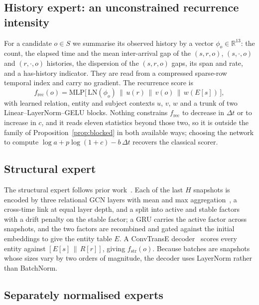 \documentclass[conference]{IEEEtran}
\begin{document}
\subsection{History expert: an unconstrained recurrence intensity}
\label{sec:rec}

For a candidate $o \in S$ we summarise its observed history by a vector
$\phi_o \in \mathbb{R}^{13}$: the count, the elapsed time and the mean
inter-arrival gap of the $(s,r,o)$, $(s,\cdot,o)$ and $(r,\cdot,o)$ histories,
the dispersion of the $(s,r,o)$ gaps, its span and rate, and a has-history
indicator. They are read from a compressed sparse-row temporal index and carry
no gradient. The recurrence score is
\begin{equation}
f_{\mathrm{rec}}(o) = \mathrm{MLP}\bigl[\,\mathrm{LN}(\phi_o)\,\|\,u(r)\,\|\,
v(o)\,\|\,w(E[s])\,\bigr],
\end{equation}
with learned relation, entity and subject contexts $u$, $v$, $w$ and a trunk of
two Linear--LayerNorm--GELU blocks. Nothing constrains $f_{\mathrm{rec}}$ to
decrease in $\Delta t$ or to increase in $c$, and it reads eleven statistics
beyond those two, so it is outside the family of
Proposition~\ref{prop:blocked} in both available ways; choosing the network to
compute $\log a + p\log(1+c) - b\,\Delta t$ recovers the classical scorer.

\subsection{Structural expert}

The structural expert follows prior work~\cite{dimnet,regcn}. Each of the last
$H$ snapshots is encoded by three relational GCN layers with mean and max
aggregation~\cite{pna}, a cross-time link at equal layer depth, and a split
into active and stable factors with a drift penalty on the stable factor; a
GRU carries the active factor across snapshots, and the two factors are
recombined and gated against the initial embeddings to give the entity table
$E$. A
ConvTransE decoder~\cite{convtranse} scores every entity against
$[E[s]\,\|\,R[r]]$, giving $f_{\mathrm{str}}(o)$. Because batches are
snapshots whose sizes vary by two orders of magnitude, the decoder uses
LayerNorm rather than BatchNorm.

\subsection{Separately normalised experts}
\label{sec:mix}
\end{document}
